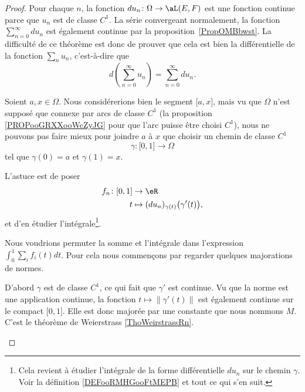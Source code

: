 \begin{proof}
	Pour chaque \( n\), la fonction \( du_n\colon \Omega\to \aL(E,F)\) est une fonction continue parce que \( u_n\) est de classe \( C^1\). La série convergeant normalement, la fonction \( \sum_{n=0}^{\infty}du_n\) est également continue par la proposition~\ref{PropOMBbwst}. La difficulté de ce théorème est donc de prouver que cela est bien la différentielle de la fonction \( \sum_nu_n\), c'est-à-dire que
	\begin{equation}
		d\left( \sum_{n=0}^{\infty}u_n \right)=\sum_{n=0}^{\infty}du_n.
	\end{equation}

	Soient \( a,x\in \Omega\). Nous considérerions bien le segment \( \mathopen[ a , x \mathclose]\), mais vu que \( \Omega\) n'est supposé que connexe par arcs de classe \( C^1\) (la proposition \ref{PROPooGRXXooWcZyJG} pour que l'arc puisse être choisi \( C^1\)), nous ne pouvons pas faire mieux pour joindre \( a\) à \( x\) que choisir un chemin de classe \( C^1\)
	\begin{equation}
		\gamma\colon \mathopen[ 0 , 1 \mathclose]\to \Omega
	\end{equation}
	tel que \( \gamma(0)=a\) et \( \gamma(1)=x\).

	L'astuce est de poser
	\begin{equation}
		\begin{aligned}
			f_n\colon \mathopen[ 0 , 1 \mathclose] & \to \eR                                           \\
			t                                      & \mapsto (du_n)_{\gamma(t)}\big( \gamma'(t) \big),
		\end{aligned}
	\end{equation}
	et d'en étudier l'intégrale\footnote{Cela revient à étudier l'intégrale de la forme différentielle \( du_n\) sur le chemin \( \gamma\). Voir la définition \ref{DEFooRMHGooFtMEPB} et tout ce qui s'en suit.}.

	\begin{subproof}
		Nous voudrions permuter la somme et l'intégrale dans l'expression \( \int_0^1\sum_if_i(t)dt\). Pour cela nous commençons par regarder quelques majorations de normes.

		D'abord \( \gamma\) est de classe \( C^1\), ce qui fait que \( \gamma'\) est continue. Vu que la norme est une application continue, la fonction \( t\mapsto \| \gamma'(t) \|\) est également continue sur le compact \( \mathopen[ 0 , 1 \mathclose]\). Elle est donc majorée par une constante que nous nommons \( M\). C'est le théorème de Weierstrass \ref{ThoWeirstrassRn}.


\end{subproof}
\end{proof}
